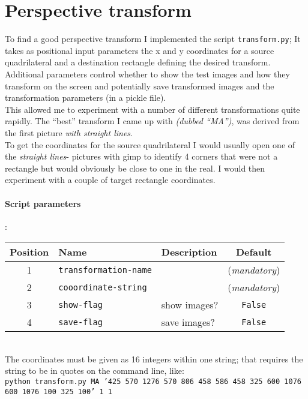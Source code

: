 \documentclass[a4paper]{article}
\begin{document}
\section{Perspective transform}
To find a good perspective transform I implemented the script \texttt{transform.py};
It takes as positional input parameters the x and y coordinates for a source quadrilateral
and a destination rectangle defining the desired transform.
\\
Additional parameters control whether to show the test images and how they transform
on the screen and potentially save transformed images and the transformation
parameters (in a pickle file).
\\
This allowed me to experiment with a number of different transformations quite rapidly.
The \enquote{best} transform I came up with \textit{(dubbed \enquote{MA})}, was derived
from the first picture \textit{with straight lines}.
\\
To get the coordinates for the source quadrilateral I would usually open one of
the \textit{straight lines}- pictures with gimp to identify 4 corners that were
not a rectangle but would obviously be close to one in the real. I would then
experiment with a couple of target rectangle coordinates.

\paragraph{Script parameters}
:\\
\small
\begin{tabular}{ |c|l|l|c| }
  \hline
Position & Name & Description & Default \\
  \hline
1 & \texttt{transformation-name} &  & (\textit{mandatory}) \\
2 & \texttt{cooordinate-string} &  & (\textit{mandatory}) \\
3 & \texttt{show-flag} & show images? & \texttt{False} \\
4 & \texttt{save-flag} & save images? & \texttt{False} \\
\hline
\end{tabular}
\normalsize
\\
The coordinates must be given as 16 integers within one string; that requires
the string to be in quotes on the command line, like:\\
\tiny
\texttt{python transform.py MA '425 570 1276 570 806 458 586 458  325 600 1076 600 1076 100 325 100' 1 1}
\normalsize
\end{document}
